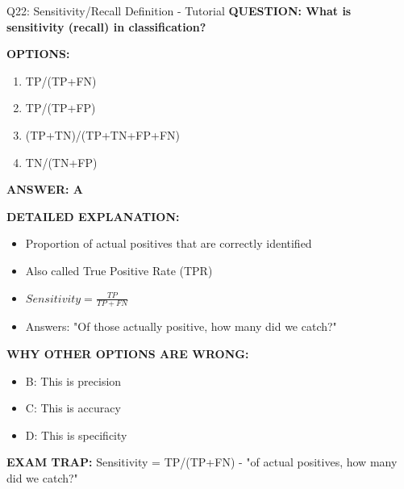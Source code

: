 \documentclass[8pt]{beamer}
\begin{document}
	\begin{frame}{Q22: Sensitivity/Recall Definition - Tutorial}
		\fontsize{6.5}{7.5}\selectfont
		\textbf{QUESTION: What is sensitivity (recall) in classification?}
		
		\vspace{0.1cm}
		\textbf{OPTIONS:}
		\begin{enumerate}
			\item TP/(TP+FN)
			\item TP/(TP+FP)
			\item (TP+TN)/(TP+TN+FP+FN)
			\item TN/(TN+FP)
		\end{enumerate}
		
		\vspace{0.1cm}
		\textcolor{myblue}{\textbf{ANSWER: A}}
		
		\vspace{0.1cm}
		\textbf{DETAILED EXPLANATION:}
		\begin{itemize}
			\item Proportion of actual positives that are correctly identified
			\item Also called True Positive Rate (TPR)
			\item $Sensitivity = \frac{TP}{TP+FN}$
			\item Answers: "Of those actually positive, how many did we catch?"
		\end{itemize}
		
		\vspace{0.1cm}
		\textcolor{myred}{\textbf{WHY OTHER OPTIONS ARE WRONG:}}
		\begin{itemize}
			\item \textcolor{myred}{B:} This is precision
			\item \textcolor{myred}{C:} This is accuracy
			\item \textcolor{myred}{D:} This is specificity
		\end{itemize}
		
		\textcolor{myred}{\textbf{EXAM TRAP:}} Sensitivity = \textcolor{myblue}{TP/(TP+FN)} - "of actual positives, how many did we catch?"
	\end{frame}
	
\end{document}
